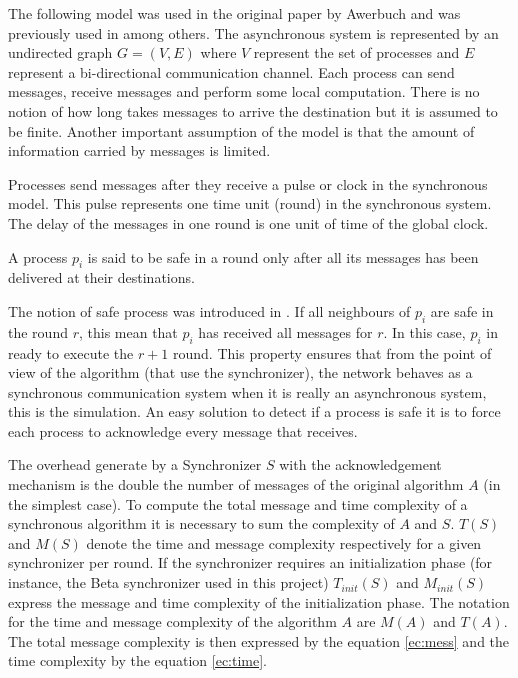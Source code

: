 The following model was used in the original paper by Awerbuch \cite{awerbuch1985complexity} and was previously used in \cite{segall1983distributed,gallager1982distributed} among others. The asynchronous system is represented by an undirected graph $G = (V,E)$ where $V$ represent the set of processes and $E$ represent a bi-directional communication channel. Each process can send messages, receive messages and perform some local computation. There is no notion of how long takes messages to arrive the destination but it is assumed to be finite. Another important assumption of the model is that the amount of information carried by messages is limited. 

Processes send messages after they receive a pulse or clock in the synchronous model. This pulse represents one time unit (round) in the synchronous system. The delay of the messages in one round is one unit of time of the global clock.

\begin{definition}
\label{def:safe}
A process $p_i$ is said to be safe in a round only after all its messages has been delivered at their destinations.
\end{definition}

The notion of safe process was introduced in \cite{awerbuch1985complexity}. If all neighbours of $p_i$ are safe in the round $r$, this mean that $p_i$ has received all messages for $r$. In this case, $p_i$ in ready to execute the $r + 1$ round. This property ensures that from the point of view of the algorithm (that use the synchronizer), the network behaves as a synchronous communication system when it is really an asynchronous system, this is the simulation. An easy solution to detect if a process is safe it is to force each process to acknowledge every message that receives. 

The  overhead generate by a Synchronizer $S$ with the acknowledgement mechanism is the double the number of messages of the original algorithm $A$ (in the simplest case). To compute the total message and time complexity of a synchronous algorithm it is necessary to sum the complexity of $A$ and $S$. $T(S)$ and $M(S)$ denote the time and message complexity respectively for a given synchronizer per round. If the synchronizer requires an initialization phase (for instance, the Beta synchronizer used in this project) $T_{init}(S)$ and $M_{init}(S)$ express the message and time complexity of the initialization phase. The notation for the time and message complexity of the algorithm $A$ are $M(A)$ and $T(A)$. The total message complexity is then expressed by the equation \ref{ec:mess} and the time complexity by the equation \ref{ec:time}. 


